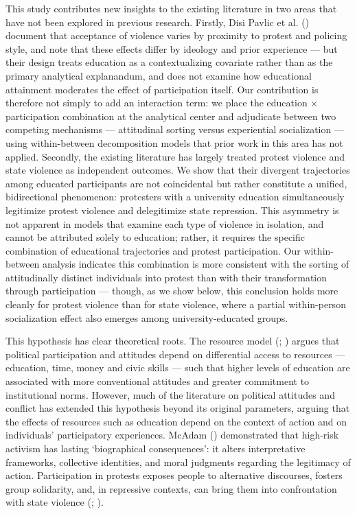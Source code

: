\documentclass[
  13pt,
]{article}
\begin{document}
This study contributes new insights to the existing literature in two
areas that have not been explored in previous research. Firstly, Disi
Pavlic et al. ()
document that acceptance of violence varies by proximity to protest and
policing style, and note that these effects differ by ideology and prior
experience --- but their design treats education as a contextualizing
covariate rather than as the primary analytical explanandum, and does
not examine how educational attainment moderates the effect of
participation itself. Our contribution is therefore not simply to add an
interaction term: we place the education × participation combination at
the analytical center and adjudicate between two competing mechanisms
--- attitudinal sorting versus experiential socialization --- using
within-between decomposition models that prior work in this area has not
applied. Secondly, the existing literature has largely treated protest
violence and state violence as independent outcomes. We show that their
divergent trajectories among educated participants are not coincidental
but rather constitute a unified, bidirectional phenomenon: protesters
with a university education simultaneously legitimize protest violence
and delegitimize state repression. This asymmetry is not apparent in
models that examine each type of violence in isolation, and cannot be
attributed solely to education; rather, it requires the specific
combination of educational trajectories and protest participation. Our
within-between analysis indicates this combination is more consistent
with the sorting of attitudinally distinct individuals into protest than
with their transformation through participation --- though, as we show
below, this conclusion holds more cleanly for protest violence than for
state violence, where a partial within-person socialization effect also
emerges among university-educated groups.

This hypothesis has clear theoretical roots. The resource model
(;
) argues that
political participation and attitudes depend on differential access to
resources --- education, time, money and civic skills --- such that
higher levels of education are associated with more conventional
attitudes and greater commitment to institutional norms. However, much
of the literature on political attitudes and conflict has extended this
hypothesis beyond its original parameters, arguing that the effects of
resources such as education depend on the context of action and on
individuals' participatory experiences. McAdam
()
demonstrated that high-risk activism has lasting `biographical
consequences': it alters interpretative frameworks, collective
identities, and moral judgments regarding the legitimacy of action.
Participation in protests exposes people to alternative discourses,
fosters group solidarity, and, in repressive contexts, can bring them
into confrontation with state violence
(;
).
\end{document}
